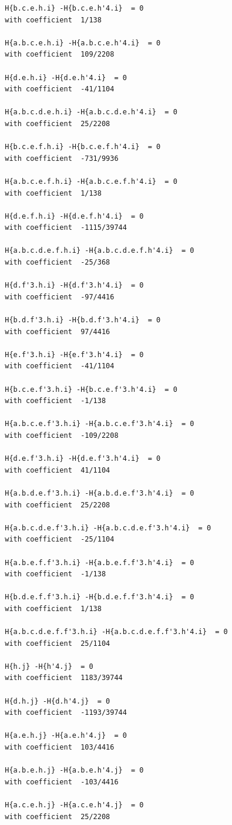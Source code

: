 \documentclass[11pt, a4paper]{kybernetika}
\begin{document}
\begin{verbatim}
		H{b.c.e.h.i} -H{b.c.e.h'4.i}  = 0
		with coefficient  1/138
		
		H{a.b.c.e.h.i} -H{a.b.c.e.h'4.i}  = 0
		with coefficient  109/2208
		
		H{d.e.h.i} -H{d.e.h'4.i}  = 0
		with coefficient  -41/1104
		
		H{a.b.c.d.e.h.i} -H{a.b.c.d.e.h'4.i}  = 0
		with coefficient  25/2208
		
		H{b.c.e.f.h.i} -H{b.c.e.f.h'4.i}  = 0
		with coefficient  -731/9936
		
		H{a.b.c.e.f.h.i} -H{a.b.c.e.f.h'4.i}  = 0
		with coefficient  1/138
		
		H{d.e.f.h.i} -H{d.e.f.h'4.i}  = 0
		with coefficient  -1115/39744
		
		H{a.b.c.d.e.f.h.i} -H{a.b.c.d.e.f.h'4.i}  = 0
		with coefficient  -25/368
		
		H{d.f'3.h.i} -H{d.f'3.h'4.i}  = 0
		with coefficient  -97/4416
		
		H{b.d.f'3.h.i} -H{b.d.f'3.h'4.i}  = 0
		with coefficient  97/4416
		
		H{e.f'3.h.i} -H{e.f'3.h'4.i}  = 0
		with coefficient  -41/1104
		
		H{b.c.e.f'3.h.i} -H{b.c.e.f'3.h'4.i}  = 0
		with coefficient  -1/138
		
		H{a.b.c.e.f'3.h.i} -H{a.b.c.e.f'3.h'4.i}  = 0
		with coefficient  -109/2208
		
		H{d.e.f'3.h.i} -H{d.e.f'3.h'4.i}  = 0
		with coefficient  41/1104
		
		H{a.b.d.e.f'3.h.i} -H{a.b.d.e.f'3.h'4.i}  = 0
		with coefficient  25/2208
		
		H{a.b.c.d.e.f'3.h.i} -H{a.b.c.d.e.f'3.h'4.i}  = 0
		with coefficient  -25/1104
		
		H{a.b.e.f.f'3.h.i} -H{a.b.e.f.f'3.h'4.i}  = 0
		with coefficient  -1/138
		
		H{b.d.e.f.f'3.h.i} -H{b.d.e.f.f'3.h'4.i}  = 0
		with coefficient  1/138
		
		H{a.b.c.d.e.f.f'3.h.i} -H{a.b.c.d.e.f.f'3.h'4.i}  = 0
		with coefficient  25/1104
		
		H{h.j} -H{h'4.j}  = 0
		with coefficient  1183/39744
		
		H{d.h.j} -H{d.h'4.j}  = 0
		with coefficient  -1193/39744
		
		H{a.e.h.j} -H{a.e.h'4.j}  = 0
		with coefficient  103/4416
		
		H{a.b.e.h.j} -H{a.b.e.h'4.j}  = 0
		with coefficient  -103/4416
		
		H{a.c.e.h.j} -H{a.c.e.h'4.j}  = 0
		with coefficient  25/2208
		

\end{verbatim}
\end{document}
